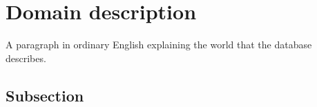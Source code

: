 \section{Domain description}\label{Section label}
A paragraph in ordinary English explaining the world that the database describes.
\subsection{Subsection}\label{subsection}